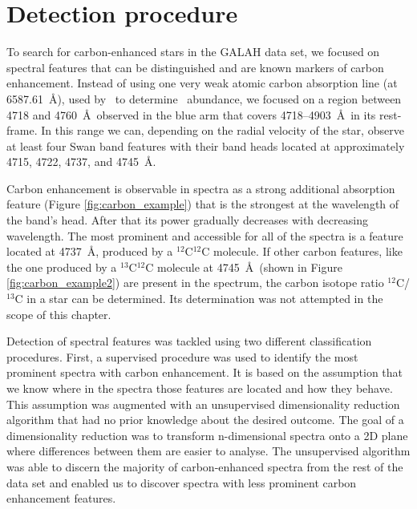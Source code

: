 \section{Detection procedure}
\label{sec:classification_cemp}
To search for carbon-enhanced stars in the GALAH data set, we focused on spectral features that can be distinguished and are known markers of carbon enhancement. Instead of using one very weak atomic carbon absorption line (at 6587.61~\AA), used by \TC\ to determine \Cfe\ abundance, we focused on a region between 4718 and 4760~\AA\ observed in the blue arm that covers 4718--4903~\AA\ in its rest-frame. In this range we can, depending on the radial velocity of the star, observe at least four Swan band features \citep{1927RSPTA.226..157J} with their band heads located at approximately 4715, 4722, 4737, and 4745~\AA. 

Carbon enhancement is observable in spectra as a strong additional absorption feature (Figure \ref{fig:carbon_example}) that is the strongest at the wavelength of the band's head. After that its power gradually decreases with decreasing wavelength. The most prominent and accessible for all of the spectra is a feature located at 4737~\AA, produced by a $^{12}$C$^{12}$C molecule. If other carbon features, like the one produced by a $^{13}$C$^{12}$C molecule at 4745~\AA\ (shown in Figure \ref{fig:carbon_example2}) are present in the spectrum, the carbon isotope ratio $^{12}$C/$^{13}$C in a star can be determined. Its determination was not attempted in the scope of this chapter.

Detection of spectral features was tackled using two different classification procedures. First, a supervised procedure was used to identify the most prominent spectra with carbon enhancement. It is based on the assumption that we know where in the spectra those features are located and how they behave. This assumption was augmented with an unsupervised dimensionality reduction algorithm that had no prior knowledge about the desired outcome. The goal of a dimensionality reduction was to transform n-dimensional spectra onto a 2D plane where differences between them are easier to analyse. The unsupervised algorithm was able to discern the majority of carbon-enhanced spectra from the rest of the data set and enabled us to discover spectra with less prominent carbon enhancement features.

